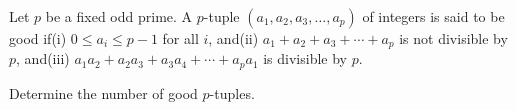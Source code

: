 Let $p$ be a fixed odd prime. A $p$-tuple $(a_1,a_2,a_3,\ldots,a_p)$ of integers is said to be good if(i) $0\le a_i\le p-1$ for all $i$,  and(ii) $a_1+a_2+a_3+\cdots+a_p$ is not divisible by $p$,  and(iii) $a_1a_2+a_2a_3+a_3a_4+\cdots+a_pa_1$ is divisible by $p$.

Determine the number of good $p$-tuples.